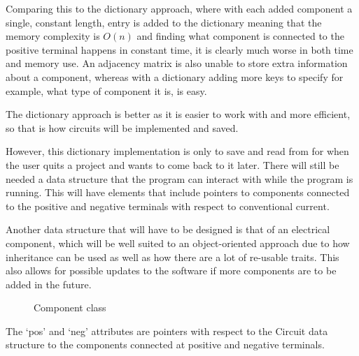        Comparing this to the dictionary approach, where with each added component a single, constant length, entry is added to the dictionary meaning that the memory complexity is \(O(n )\) and finding what component is connected to the positive terminal happens in constant time, it is clearly much worse in both time and memory use. 
        An adjacency matrix is also unable to store extra information about a component, whereas with a dictionary adding more keys to specify for example, what type of component it is, is easy.

        The dictionary approach is better as it is easier to work with and more efficient, so that is how circuits will be implemented and saved. 

        However, this dictionary implementation is only to save and read from for when the user quits a project and wants to come back to it later. 
        There will still be needed a data structure that the program can interact with while the program is running. 
        This will have elements that include pointers to components connected to the positive and negative terminals with respect to conventional current. 

        Another data structure that will have to be designed is that of an electrical component, which will be well suited to an object-oriented approach due to how inheritance can be used as well as how there are a lot of re-usable traits. 
        This also allows for possible updates to the software if more components are to be added in the future.

        \begin{figure}[!ht]
            \centering
            \caption{Component class}
            \label{fig:component-class-uml}
        \end{figure}

        The `pos' and `neg' attributes are pointers with respect to the Circuit data structure to the components connected at positive and negative terminals. 

